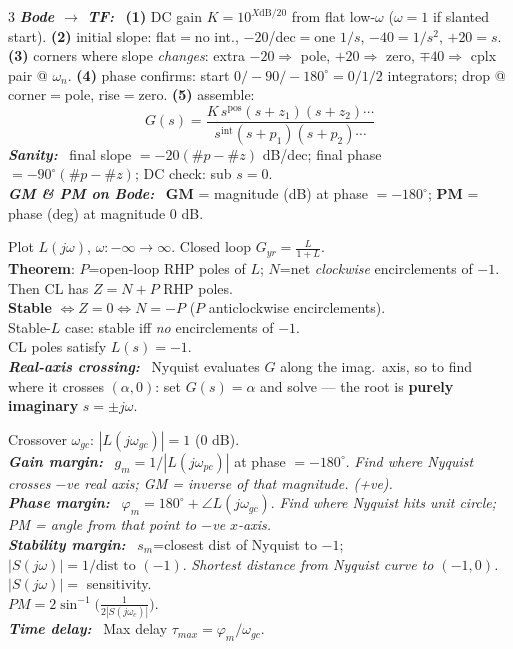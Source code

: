 \documentclass[9pt]{extarticle}
\newcommand{\sect}[1]{%
  \vspace{2pt}\par\noindent
  \colorbox{hdrbg}{\makebox[\dimexpr\linewidth-2\fboxsep][l]{%
    \textbf{\footnotesize\textcolor{hdr}{#1}}}}%
  \par\vspace{1.5pt}}
\newcommand{\sub}[1]{\textit{\textbf{#1:}}\ }
\begin{document}
\begin{multicols}{3}
\sub{Bode $\to$ TF} \textbf{(1)} DC gain $K{=}10^{X\text{dB}/20}$ from flat low-$\omega$ ($\omega=1$ if slanted start). \textbf{(2)} initial slope: flat$=$no int., $-20$/dec$=$one $1/s$, $-40{=}1/s^2$, $+20{=}s$. \textbf{(3)} corners where slope \emph{changes}: extra $-20\Rightarrow$ pole, $+20\Rightarrow$ zero, $\mp40\Rightarrow$ cplx pair @ $\omega_n$. \textbf{(4)} phase confirms: start $0/{-}90/{-}180^\circ{=}0/1/2$ integrators; drop @ corner$=$pole, rise$=$zero. \textbf{(5)} assemble:
\[ G(s)=\frac{K\,s^{\text{pos}}(s{+}z_1)(s{+}z_2)\cdots}{s^{\text{int}}(s{+}p_1)(s{+}p_2)\cdots} \]
\sub{Sanity} final slope $=-20(\#p{-}\#z)$ dB/dec; final phase $=-90^\circ(\#p{-}\#z)$; DC check: sub $s{=}0$.\\
\sub{GM \& PM on Bode} $\mathbf{GM}$ = magnitude (dB) at phase $=-180^\circ$; $\mathbf{PM}$ = phase (deg) at magnitude $0$ dB.

\sect{14. Nyquist Criterion (Lec 10,12)}
Plot $L(j\omega)$, $\omega:-\infty\to\infty$. Closed loop $G_{yr}=\tfrac{L}{1+L}$.\\
\textbf{Theorem}: $P$=open-loop RHP poles of $L$; $N$=net \emph{clockwise} encirclements of $-1$. Then CL has $Z=N+P$ RHP poles.\\
\textbf{Stable} $\Leftrightarrow Z=0\Leftrightarrow N=-P$ ($P$ anticlockwise encirclements).\\
Stable-$L$ case: stable iff \emph{no} encirclements of $-1$.\\
CL poles satisfy $L(s)=-1$.\\
\sub{Real-axis crossing} Nyquist evaluates $G$ along the imag.\ axis, so to find where it crosses $(\alpha,0)$: set $G(s){=}\alpha$ and solve — the root is \textbf{purely imaginary} $s{=}\pm j\omega$.

\sect{15. Stability Margins (Lec 10,11)}
Crossover $\omega_{gc}$: $|L(j\omega_{gc})|=1$ (0 dB).\\
\sub{Gain margin} $g_m=1/|L(j\omega_{pc})|$ at phase $=-180^\circ$. \textit{Find where Nyquist crosses $-$ve real axis; GM = inverse of that magnitude. (+ve).}\\
\sub{Phase margin} $\varphi_m=180^\circ+\angle L(j\omega_{gc})$. \textit{Find where Nyquist hits unit circle; PM = angle from that point to $-$ve $x$-axis.}\\
\sub{Stability margin} $s_m$=closest dist of Nyquist to $-1$; $|S(j\omega)|=1/\text{dist to }(-1)$. \textit{Shortest distance from Nyquist curve to $(-1,0)$.} $|S(j\omega)|=$ sensitivity. \\
$PM=2\sin^{-1}\!\big(\tfrac{1}{2|S(j\omega_c)|}\big)$.\\
\sub{Time delay} Max delay $\tau_{max}=\varphi_m/\omega_{gc}$.


\end{multicols}
\end{document}
